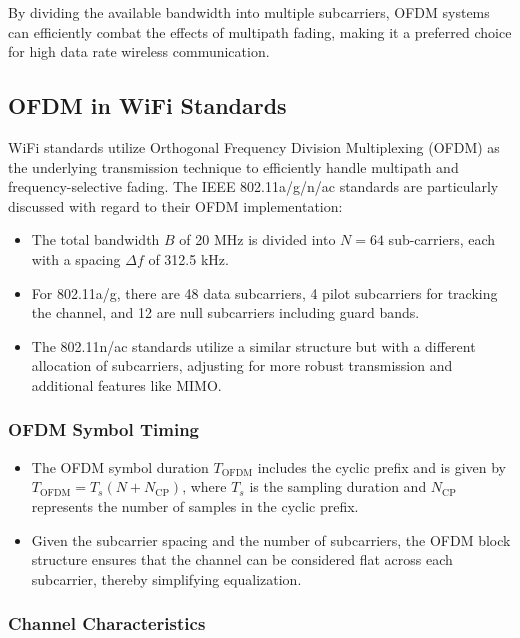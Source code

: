By dividing the available bandwidth into multiple subcarriers, OFDM systems can efficiently combat the effects of multipath fading, making it a preferred choice for high data rate wireless communication.

\subsection*{OFDM in WiFi Standards}

WiFi standards utilize Orthogonal Frequency Division Multiplexing (OFDM) as the underlying transmission technique to efficiently handle multipath and frequency-selective fading. The IEEE 802.11a/g/n/ac standards are particularly discussed with regard to their OFDM implementation:

\begin{itemize}
    \item The total bandwidth \( B \) of 20 MHz is divided into \( N = 64 \) sub-carriers, each with a spacing \( \Delta f \) of 312.5 kHz.
    \item For 802.11a/g, there are 48 data subcarriers, 4 pilot subcarriers for tracking the channel, and 12 are null subcarriers including guard bands.
    \item The 802.11n/ac standards utilize a similar structure but with a different allocation of subcarriers, adjusting for more robust transmission and additional features like MIMO.
\end{itemize}

\subsubsection*{OFDM Symbol Timing}

\begin{itemize}
    \item The OFDM symbol duration \( T_{\text{OFDM}} \) includes the cyclic prefix and is given by \( T_{\text{OFDM}} = T_s (N + N_{\text{CP}}) \), where \( T_s \) is the sampling duration and \( N_{\text{CP}} \) represents the number of samples in the cyclic prefix.
    \item Given the subcarrier spacing and the number of subcarriers, the OFDM block structure ensures that the channel can be considered flat across each subcarrier, thereby simplifying equalization.
\end{itemize}

\subsubsection*{Channel Characteristics}

